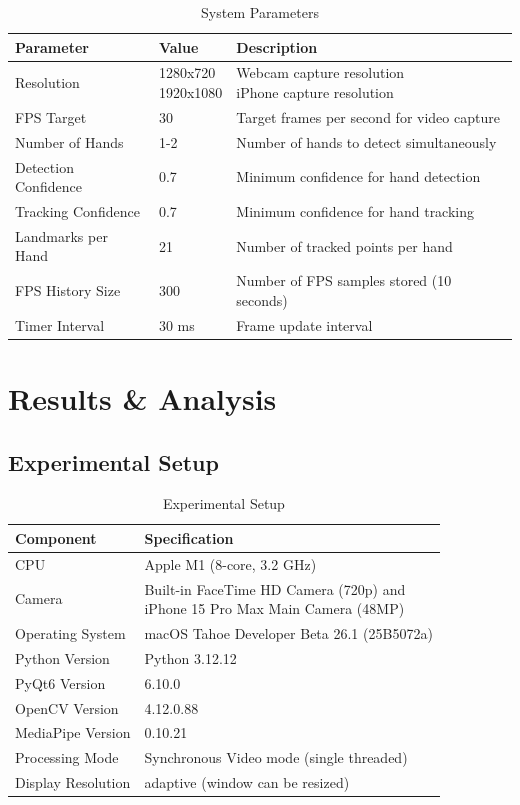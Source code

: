 \documentclass{article}
\begin{document}
\begin{table}[H]
	\centering
	\begin{tabular}{|l|l|l|}
		\hline
		\textbf{Parameter} & \textbf{Value} & \textbf{Description} \\\hline
		Resolution & \makecell[l]{1280x720\\1920x1080} & \makecell[l]{Webcam capture resolution\\iPhone capture resolution} \\\hline
		FPS Target & 30 & Target frames per second for video capture \\\hline
		Number of Hands & 1-2 & Number of hands to detect simultaneously \\\hline
		Detection Confidence & 0.7 & Minimum confidence for hand detection \\\hline
		Tracking Confidence & 0.7 & Minimum confidence for hand tracking \\\hline
		Landmarks per Hand & 21 & Number of tracked points per hand \\\hline
		FPS History Size & 300 & Number of FPS samples stored (10 seconds) \\\hline
		Timer Interval & 30 ms & Frame update interval \\\hline
	\end{tabular}
	\caption{System Parameters}
\end{table}

\section{Results \& Analysis}

\subsection{Experimental Setup}

\begin{table}[H]
	\centering
	\begin{tabular}{|l|l|}
		\hline
		\textbf{Component} & \textbf{Specification} \\\hline
		CPU & Apple M1 (8-core, 3.2 GHz) \\\hline
		Camera & \makecell[l]{Built-in FaceTime HD Camera (720p) and\\ iPhone 15 Pro Max Main Camera (48MP)} \\\hline
		Operating System & macOS Tahoe Developer Beta 26.1 (25B5072a) \\\hline
		Python Version & Python 3.12.12 \\\hline
		PyQt6 Version & 6.10.0\\\hline
		OpenCV Version & 4.12.0.88 \\\hline
		MediaPipe Version & 0.10.21 \\\hline
		Processing Mode & Synchronous Video mode (single threaded) \\\hline
		Display Resolution & adaptive (window can be resized) \\\hline
	\end{tabular}
	\caption{Experimental Setup}
\end{table}
\end{document}
